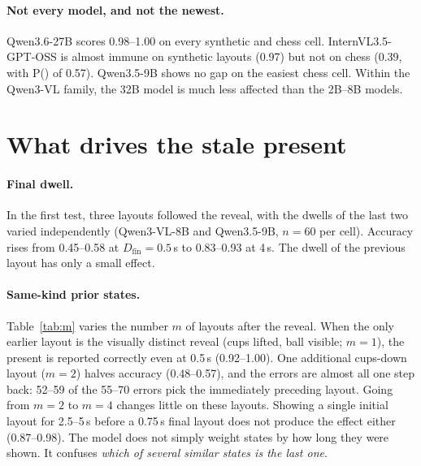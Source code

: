 \documentclass[10pt,twocolumn,letterpaper]{article}
\newcommand{\pstale}{P(\text{stale})}
\begin{document}
\paragraph{Not every model, and not the newest.} Qwen3.6-27B scores 0.98--1.00 on every synthetic and chess cell. InternVL3.5-GPT-OSS is almost immune on synthetic layouts (0.97) but not on chess (0.39, with \pstale{} of 0.57). Qwen3.5-9B shows no gap on the easiest chess cell. Within the Qwen3-VL family, the 32B model is much less affected than the 2B--8B models.

\section{What drives the stale present}
\label{sec:drivers}

\paragraph{Final dwell.} In the first test, three layouts followed the reveal, with the dwells of the last two varied independently (Qwen3-VL-8B and Qwen3.5-9B, $n=60$ per cell). Accuracy rises from 0.45--0.58 at $D_\text{fin}=0.5$\,s to 0.83--0.93 at 4\,s. The dwell of the previous layout has only a small effect.

\paragraph{Same-kind prior states.} Table~\ref{tab:m} varies the number $m$ of layouts after the reveal. When the only earlier layout is the visually distinct reveal (cups lifted, ball visible; $m=1$), the present is reported correctly even at 0.5\,s (0.92--1.00). One additional cups-down layout ($m=2$) halves accuracy (0.48--0.57), and the errors are almost all one step back: 52--59 of the 55--70 errors pick the immediately preceding layout. Going from $m=2$ to $m=4$ changes little on these layouts. Showing a single initial layout for 2.5--5\,s before a 0.75\,s final layout does not produce the effect either (0.87--0.98). The model does not simply weight states by how long they were shown. It confuses \emph{which of several similar states is the last one}.
\end{document}
